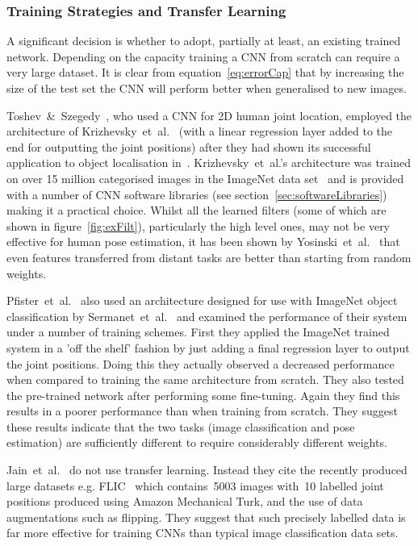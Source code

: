 \documentclass[11pt]{article} %
\begin{document}
\subsubsection{Training Strategies and Transfer Learning}

A significant decision is whether to adopt, partially at least, an existing trained network. Depending on the capacity training a CNN from scratch can require a very large dataset. It is clear from equation~\ref{eq:errorCap} that by increasing the size of the test set the CNN will perform better when generalised to new images. 

Toshev~\&~Szegedy~\cite{Toshev}, who used a CNN for 2D human joint location, employed the architecture of Krizhevsky~et~al.~\cite{Krizhevsky2012} (with a linear regression layer added to the end for outputting the joint positions) after they had shown its successful application to object localisation in~\cite{Szegedy2013}. Krizhevsky~et~al.'s architecture was trained on over 15 million categorised images in the ImageNet data set~\cite{Russakovsky} and is provided with a number of CNN software libraries (see section~\ref{sec:softwareLibraries}) making it a practical choice. Whilst all the learned filters (some of which are shown in figure~\ref{fig:exFilt}), particularly the high level ones, may not be very effective for human pose estimation, it has been shown by Yosinski~et~al.~\cite{Yosinski2014} that even features transferred from distant tasks are better than starting from random weights.

Pfister~et~al.~\cite{Pfister} also used an architecture designed for use with ImageNet object classification by Sermanet~et~al.~\cite{Sermanet2013b} and examined the performance of their system under a number of training schemes. First they applied the ImageNet trained system in a 'off the shelf' fashion by just adding a final regression layer to output the joint positions. Doing this they actually observed a decreased performance when compared to training the same architecture from scratch. They also tested the pre-trained network after performing some fine-tuning. Again they find this results in a poorer performance than when training from scratch. They suggest these results indicate that the two tasks (image classification and pose estimation) are sufficiently different to require considerably different weights. %

Jain~et~al.~\cite{Jain2014,Jain2013a} do not use transfer learning. Instead they cite the recently produced large datasets e.g. FLIC~\cite{Sapp2013} which contains~5003 images with~10 labelled joint positions produced using Amazon Mechanical Turk, and the use of data augmentations such as flipping. They suggest that such precisely labelled data is far more effective for training CNNs than typical image classification data sets.
\end{document}
